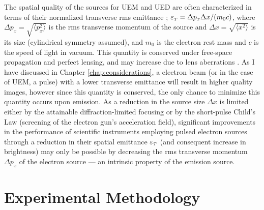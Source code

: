

The spatial quality of the sources for UEM and UED are often characterized in terms of their normalized transverse rms emittance \cite{dowell_quantum_2009,jensen_emittance_2010}; $\varepsilon_{{\scriptscriptstyle T}} = \Delta p_x \Delta x / (m_0 c)$, where $\Delta p_x = \sqrt{ \langle p_x^2 \rangle }$ is the rms transverse momentum of the source and $\Delta x = \sqrt{ \langle x^2 \rangle }$  is its size (cylindrical symmetry assumed), and $m_0$ is the electron rest mass and $c$ is the speed of light in vacuum.
This quantity is conserved under free-space propagation and perfect lensing, and may increase due to lens aberrations \cite{oshea_reversible_1998}.
As I have discussed in Chapter \ref{chap:considerations}, a electron beam (or in the case of UEM, a pulse) with a lower transverse emittance will result in higher quality images, however since this quantity is conserved, the only chance to minimize this quantity occurs upon emission.
As a reduction in the source size $\Delta x$ is limited either by the attainable diffraction-limited focusing or by the short-pulse Child's Law (screening of the electron gun's acceleration field)\cite{valfells_effects_2002}, significant improvements in the performance of scientific instruments employing pulsed electron sources through a reduction in their spatial emittance $\varepsilon_{{\scriptscriptstyle T}}$ (and consequent increase in brightness\cite{berger_dc_2009}) may only be possible by decreasing the rms transverse momentum $\Delta p_x$ of the electron source --- an intrinsic property of the emission source\cite{dowell_quantum_2009,jensen_emittance_2010}.  

\section{Experimental Methodology} \label{sec:photocathode-method}

